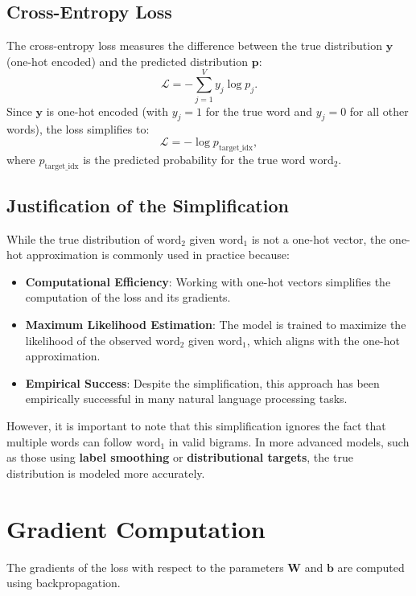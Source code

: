\begin{notechapter}
\subsection{Cross-Entropy Loss}
The cross-entropy loss measures the difference between the true distribution
\(\mathbf{y}\) (one-hot encoded) and the predicted distribution \(\mathbf{p}\):
\[
\mathcal{L} = -\sum_{j=1}^V y_j \log p_j.
\]
Since \(\mathbf{y}\) is one-hot encoded (with \(y_j = 1\) for the true word
and \(y_j = 0\) for all other words), the loss simplifies to:
\[
\mathcal{L} = -\log p_{\text{target\_idx}},
\]
where \(p_{\text{target\_idx}}\) is the predicted probability for the true
word \(\text{word}_2\).

\subsection{Justification of the Simplification}
While the true distribution of \(\text{word}_2\) given \(\text{word}_1\) is
not a one-hot vector, the one-hot approximation is commonly used in practice
because:
\begin{itemize}
    \item \textbf{Computational Efficiency}: Working with one-hot vectors
          simplifies the computation of the loss and its gradients.
    \item \textbf{Maximum Likelihood Estimation}: The model is trained to
          maximize the likelihood of the observed \(\text{word}_2\) given
          \(\text{word}_1\), which aligns with the one-hot approximation.
    \item \textbf{Empirical Success}: Despite the simplification, this
          approach has been empirically successful in many natural language
          processing tasks.
\end{itemize}

However, it is important to note that this simplification ignores the fact
that multiple words can follow \(\text{word}_1\) in valid bigrams. In more
advanced models, such as those using \textbf{label smoothing} or
\textbf{distributional targets}, the true distribution is modeled more
accurately.

\section{Gradient Computation}
The gradients of the loss with respect to the parameters \(\mathbf{W}\) and
\(\mathbf{b}\) are computed using backpropagation.


\end{notechapter}
